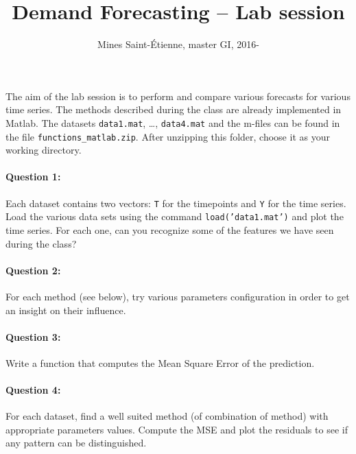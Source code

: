 \documentclass[11pt]{scrartcl}
\title{Demand Forecasting -- Lab session}
\author{Mines Saint-\'Etienne, master GI,  2016\:-\:2017 }
\date{}
\begin{document}

\maketitle

\paragraph{}
The aim of the lab session is to perform and compare various forecasts for various time series. The methods described during the class are already implemented in Matlab. The datasets \verb!data1.mat!, \dots, \verb!data4.mat! and the m-files can be found in the file \verb!functions_matlab.zip!. After unzipping this folder, choose it as your working directory.


\paragraph{Question 1: }
Each dataset contains two vectors: \texttt{T} for the timepoints and \texttt{Y} for the time series. Load the various data sets using the command \texttt{load('data1.mat')} and plot the time series. For each one, can you recognize some of the features we have seen during the class?

\paragraph{Question 2: }
For each method (see below), try various parameters configuration in order to get an insight on their influence.

\paragraph{Question 3: }
Write a function that computes the Mean Square Error of the prediction.

\paragraph{Question 4: }
For each dataset, find a well suited method (of combination of method) with appropriate parameters values. Compute the MSE and plot the residuals to see if any pattern can be distinguished.
\end{document}
